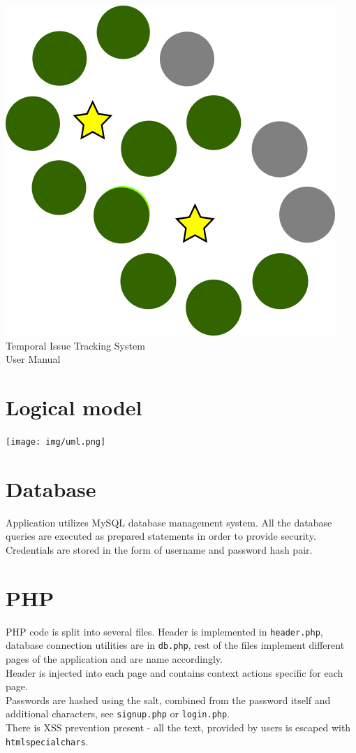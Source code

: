 \documentclass{article}
\begin{document}
\vfill
\begin{center}
    \includegraphics[scale=0.12]{../img/favicon.png}\\
{\huge Temporal Issue Tracking System\\}
{\Large User Manual}
\end{center}
\vfill
\newpage
\tableofcontents
\newpage
\setcounter{page}{3}
\section{Logical model}
\texttt{[image: img/uml.png]}
\section{Database}
Application utilizes MySQL database management system. All the database queries are executed as prepared statements in order to provide security. Credentials are stored in the form of username and password hash pair.
\section{PHP}
PHP code is split into several files. Header is implemented in \texttt{header.php}, database connection utilities are in \texttt{db.php}, rest of the files implement different pages of the application and are name accordingly.\\
Header is injected into each page and contains context actions specific for each page.\\
Passwords are hashed using the salt, combined from the password itself and additional characters, see \texttt{signup.php} or \texttt{login.php}.\\
There is XSS prevention present - all the text, provided by users is escaped with \texttt{htmlspecialchars}.
\end{document}
